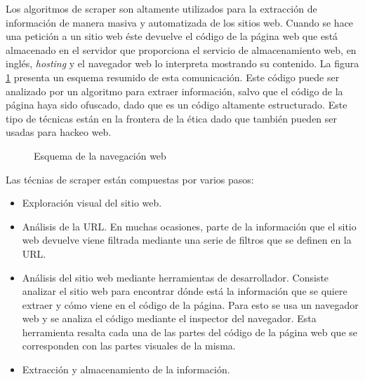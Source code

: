 Los algoritmos de \gls{scraper} son altamente utilizados para la extracción de información de manera masiva y automatizada de los sitios web. Cuando se hace una petición a un sitio web éste devuelve el código de la página web que está almacenado en el servidor que proporciona el servicio de almacenamiento web, en inglés, \textit{hosting} y el navegador web lo interpreta mostrando su contenido. La figura \ref{fig: web_nav} presenta un esquema resumido de esta comunicación. Este código puede ser analizado por un algoritmo para extraer información, salvo que el código de la página haya sido ofuscado, dado que es un código altamente estructurado. Este tipo de técnicas están en la frontera de la ética dado que también pueden ser usadas para hackeo web.

\begin{figure}[ht!]
	\centering
	\caption{Esquema de la navegación web}
	\label{fig: web_nav}
\end{figure}

Las técnias de \gls{scraper} están compuestas por varios pasos:
\begin{itemize}
	\item Exploración visual del sitio web.
	\item Análisis de la \gls{URL}. En muchas ocasiones, parte de la información que el sitio web devuelve viene filtrada mediante una serie de filtros que se definen en la \gls{URL}.
	\item Análisis del sitio web mediante herramientas de desarrollador. Consiste analizar el sitio web para encontrar dónde está la información que se quiere extraer y cómo viene en el código de la página. Para esto se usa un navegador web y se analiza el código mediante el inspector del navegador. Esta herramienta resalta cada una de las partes del código de la página web que se corresponden con las partes visuales de la misma.
	\item Extracción y almacenamiento de la información.
\end{itemize}

